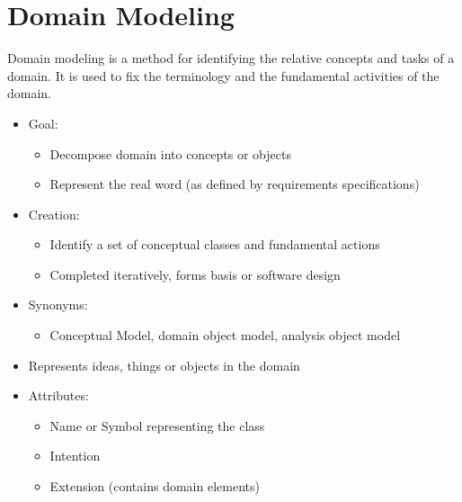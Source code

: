 \documentclass[
../../Software_Engineering_Summary.tex,
]
{subfiles}
\begin{document}
\section{Domain Modeling}
Domain modeling is a method for identifying the relative concepts and tasks of a domain. 
It is used to fix the terminology and the fundamental activities of the domain.

\begin{defbox}
    \begin{itemize}
        \item Goal: 
        \begin{itemize}
            \item Decompose domain into concepts or objects
            \item Represent the real word (as defined by requirements specifications)
        \end{itemize}
        \item Creation:
        \begin{itemize}
            \item Identify a set of conceptual classes and fundamental actions
            \item Completed iteratively, forms basis or software design
        \end{itemize}
        \item Synonyms:
        \begin{itemize}
            \item Conceptual Model, domain object model, analysis object model
        \end{itemize}
    \end{itemize}
\end{defbox}

\begin{defbox}
    \begin{itemize}
        \item Represents ideas, things or objects in the domain
        \item Attributes:
        \begin{itemize}
            \item Name or Symbol representing the class
            \item Intention
            \item Extension (contains domain elements)
        \end{itemize}
    \end{itemize}
\end{defbox}
\end{document}
